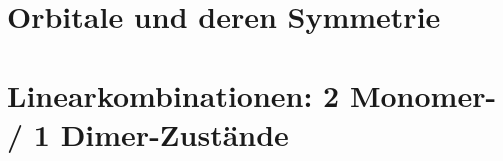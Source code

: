\documentclass{article}
\begin{document}
    
    \pagestyle{empty}
    \tableofcontents 
    \newpage 
    
    \section{Orbitale und deren Symmetrie}
\vspace{2cm}
\newpage \section{Linearkombinationen: 2 Monomer- / 1 Dimer-Zustände}
\end{document}
